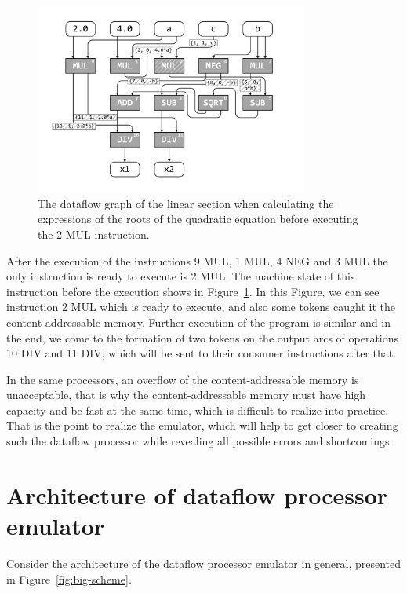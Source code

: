 \documentclass[
11pt,%
tightenlines,%
twoside,%
onecolumn,%
nofloats,%
nobibnotes,%
nofootinbib,%
superscriptaddress,%
noshowpacs,%
centertags]%
{revtex4}
\begin{document}
\begin{figure}[h]
\setcaptionmargin{5mm}
\onelinecaptionsfalse %
\includegraphics[width=0.80\textwidth]{pics/dataflow2.pdf}
\caption{The dataflow graph of the linear section when calculating the expressions of the roots of the quadratic equation before executing the 2 MUL instruction.}\label{fig:dataflow2}
\end{figure}

After the execution of the instructions 9 MUL, 1 MUL, 4 NEG and 3 MUL the only instruction is ready to execute is 2 MUL.
The machine state of this instruction before the execution shows in Figure~\ref{fig:dataflow2}.
In this Figure, we can see instruction 2 MUL which is ready to execute, and also some tokens caught it the content-addressable memory.
Further execution of the program is similar and in the end, we come to the formation of two tokens on the output arcs of operations 10 DIV and 11 DIV, which will be sent to their consumer instructions after that.

In the same processors, an overflow of the content-addressable memory is unacceptable, that is why the content-addressable memory must have high capacity and be fast at the same time, which is difficult to realize into practice.
That is the point to realize the emulator, which will help to get closer to creating such the dataflow processor while revealing all possible errors and shortcomings.

\section{Architecture of dataflow processor emulator}

Consider the architecture of the dataflow processor emulator in general, presented in Figure~\ref{fig:big-scheme}.
\end{document}
